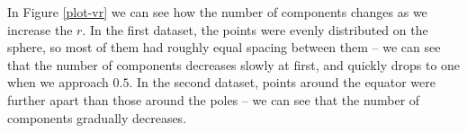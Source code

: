 \documentclass[a4paper, 12pt]{article}
\begin{document}
In Figure \ref{plot-vr} we can see how the number of components changes as we increase the $r$. 
In the first dataset, the points were evenly distributed on the sphere, so most of them had roughly equal spacing between them -- we can see that the number of components decreases slowly at first, and quickly drops to one when we approach $0.5$. 
In the second dataset, points around the equator were further apart than those around the poles -- we can see that the number of components gradually decreases.

\begin{figure}[H]
        \centering
\end{figure}
\end{document}
